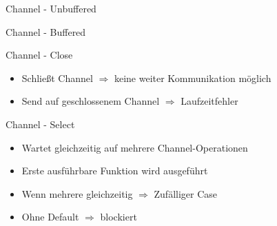 \documentclass[aspectratio=169]{beamer}  %
\begin{document}

\begin{frame}{Channel - Unbuffered}
  \begin{minipage}{0.49\textwidth}
    
  \end{minipage}
  \hfill
  \hfill
  \begin{minipage}{0.49\textwidth}
  \end{minipage}
\end{frame}

\begin{frame}{Channel - Buffered}
  \begin{minipage}{0.49\textwidth}
    
  \end{minipage}
  \hfill
  \hfill
  \begin{minipage}{0.49\textwidth}
  \end{minipage}
\end{frame}

\begin{frame}{Channel - Close}
  \begin{minipage}{0.49\textwidth}
    \begin{itemize}
      \item Schließt Channel $\Rightarrow$ keine weiter Kommunikation möglich
      \item Send auf geschlossenem Channel $\Rightarrow$ Laufzeitfehler
    \end{itemize}
  \end{minipage}
  \hfill
  \vrule{}
  \hfill
  \begin{minipage}{0.49\textwidth}
    
  \end{minipage}
\end{frame}

\begin{frame}{Channel - Select}
  \begin{minipage}{0.49\textwidth}
    \begin{itemize}
      \item Wartet gleichzeitig auf mehrere Channel-Operationen
      \item Erste ausführbare Funktion wird ausgeführt
      \item Wenn mehrere gleichzeitig $\Rightarrow$ Zufälliger Case
      \item Ohne Default $\Rightarrow$ blockiert
    \end{itemize}
  \end{minipage}
  \hfill
  \vrule{}
  \hfill
  \begin{minipage}{0.49\textwidth}
    
  \end{minipage}
\end{frame}
\end{document}

